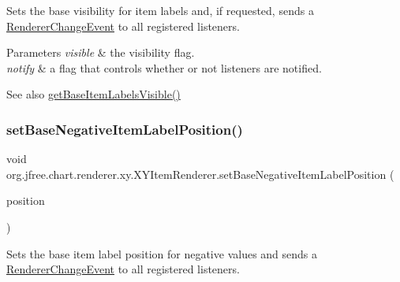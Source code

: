 Sets the base visibility for item labels and, if requested, sends a \mbox{\hyperlink{}{Renderer\+Change\+Event}} to all registered listeners.


\begin{DoxyParams}{Parameters}
{\em visible} & the visibility flag. \\
\hline
{\em notify} & a flag that controls whether or not listeners are notified.\\
\hline
\end{DoxyParams}
\begin{DoxySeeAlso}{See also}
\mbox{\hyperlink{interfaceorg_1_1jfree_1_1chart_1_1renderer_1_1xy_1_1_x_y_item_renderer_ae4e0917061a6ac9dc7d4aecae71890c5}{get\+Base\+Item\+Labels\+Visible()}} 
\end{DoxySeeAlso}
\mbox{\label{interfaceorg_1_1jfree_1_1chart_1_1renderer_1_1xy_1_1_x_y_item_renderer_ac8e02ba738601c4f11c19e075e202578}} 
\subsubsection{\texorpdfstring{set\+Base\+Negative\+Item\+Label\+Position()}{setBaseNegativeItemLabelPosition()}\hspace{0.1cm}{\footnotesize\ttfamily [1/2]}}
{\footnotesize\ttfamily void org.\+jfree.\+chart.\+renderer.\+xy.\+X\+Y\+Item\+Renderer.\+set\+Base\+Negative\+Item\+Label\+Position (\begin{DoxyParamCaption}\item[{\mbox{\hyperlink{classorg_1_1jfree_1_1chart_1_1labels_1_1_item_label_position}{Item\+Label\+Position}}}]{position }\end{DoxyParamCaption})}

Sets the base item label position for negative values and sends a \mbox{\hyperlink{}{Renderer\+Change\+Event}} to all registered listeners.


